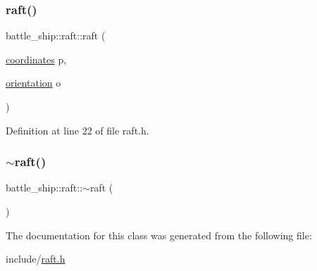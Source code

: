 \mbox{\label{classbattle__ship_1_1raft_ab76a787da1c470907eb7e166af6e0db8}} 
\subsubsection{\texorpdfstring{raft()}{raft()}\hspace{0.1cm}{\footnotesize\ttfamily [2/2]}}
{\footnotesize\ttfamily battle\+\_\+ship\+::raft\+::raft (\begin{DoxyParamCaption}\item[{\hyperlink{structbattle__ship_1_1coordinates}{coordinates}}]{p,  }\item[{\hyperlink{namespacebattle__ship_aed87488f0a73f0d0679fe343fb61c784}{orientation}}]{o }\end{DoxyParamCaption})\hspace{0.3cm}{\ttfamily [inline]}}



Definition at line 22 of file raft.\+h.

\mbox{\label{classbattle__ship_1_1raft_a4b381ef568f95e3fe097eeef75d2ac51}} 
\subsubsection{\texorpdfstring{$\sim$raft()}{~raft()}}
{\footnotesize\ttfamily battle\+\_\+ship\+::raft\+::$\sim$raft (\begin{DoxyParamCaption}{ }\end{DoxyParamCaption})\hspace{0.3cm}{\ttfamily [default]}}



The documentation for this class was generated from the following file\+:\begin{DoxyCompactItemize}
\item 
include/\hyperlink{raft_8h}{raft.\+h}\end{DoxyCompactItemize}
